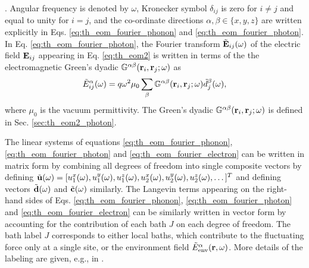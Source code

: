 . Angular frequency is denoted by $\omega$, Kronecker symbol $\delta_{ij}$ is zero for $i\neq j$ and equal to unity for $i=j$, and the co-ordinate directions $\alpha,\beta \in \{x,y,z\}$ are written explicitly in Eqs. \eqref{eq:th_eom_fourier_phonon} and \eqref{eq:th_eom_fourier_photon}. In Eq. \eqref{eq:th_eom_fourier_photon}, the Fourier transform $\tilde{\mathbf{E}}_{ij}(\omega)$ of the electric field $\mathbf{E}_{ij}$ appearing in Eq. \eqref{eq:th_eom2} is written in terms of the the electromagnetic Green's dyadic $\mathbb{G}^{\alpha\beta}(\mathbf{r}_i,\mathbf{r}_j;\omega)$ as \cite{novotny}
\begin{equation}
 \tilde{E}_{ij}^{\alpha}(\omega) = q\omega^2 \mu_0 \sum_{\beta} \mathbb{G}^{\alpha\beta}(\mathbf{r}_i,\mathbf{r}_j;\omega)\tilde{d}_j^{\beta}(\omega), \label{eq:th_Eij}
\end{equation}
where $\mu_0$ is the vacuum permittivity. The Green's dyadic $\mathbb{G}^{\alpha\beta}(\mathbf{r}_i,\mathbf{r}_j;\omega)$ is defined in Sec. \ref{sec:th_eom2_photon}. %

The linear systems of equations \eqref{eq:th_eom_fourier_phonon}, \eqref{eq:th_eom_fourier_photon} and \eqref{eq:th_eom_fourier_electron} can be written in matrix form by combining all degrees of freedom into single composite vectors by defining $\tilde{\mathbf{u}}(\omega)=[u_1^x(\omega),u_1^y(\omega),u_1^z(\omega),u_2^x(\omega),u_2^y(\omega),u_2^z(\omega),\dots]^T$ and defining vectors $\tilde{\mathbf{d}}(\omega)$ and $\tilde{\mathbf{c}}(\omega)$ similarly. The Langevin terms appearing on the right-hand sides of Eqs. \eqref{eq:th_eom_fourier_phonon}, \eqref{eq:th_eom_fourier_photon} and \eqref{eq:th_eom_fourier_electron} can be similarly written in vector form by accounting for the contribution of each bath $J$ on each degree of freedom. The bath label $J$ corresponds to either local baths, which contribute to the fluctuating force only at a single site, or the environment field $\tilde{E}_{\textrm{env}}^{\alpha}(\mathbf{r},\omega)$. More details of the labeling are given, e.g., in .

